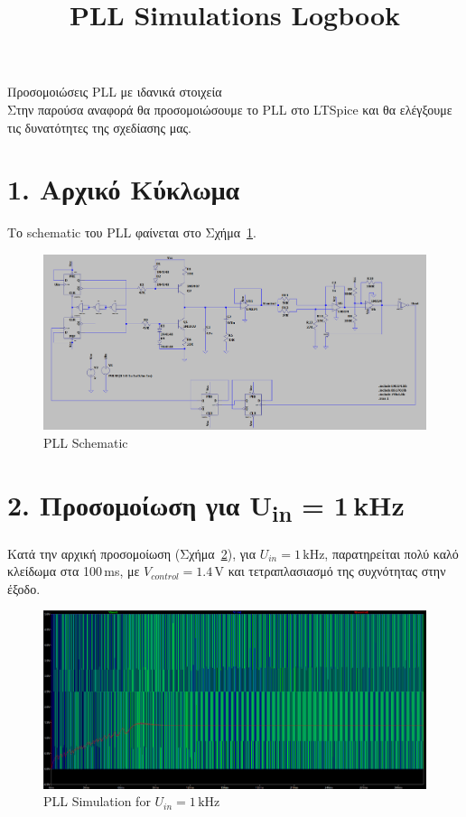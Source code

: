 \documentclass[11pt,letterpaper]{article}
\begin{document}
\univlogo

\title{PLL Simulations Logbook}
\vspace{0.5cm}
{\Huge Προσομοιώσεις PLL με ιδανικά στοιχεία}\\[5mm]

Στην παρούσα αναφορά θα προσομοιώσουμε το PLL στο LTSpice και θα ελέγξουμε τις δυνατότητες της σχεδίασης μας.\\[2mm]

\section*{1. Αρχικό Κύκλωμα}
Το schematic του PLL φαίνεται στο Σχήμα~\ref{fig:pll_schematic}.

\begin{figure}[H]
    \centering
    \includegraphics[width=\textwidth]{figures/pll.png}
    \caption{PLL Schematic}
    \label{fig:pll_schematic}
\end{figure}

\section*{2. Προσομοίωση για U\textsubscript{in} = 1 kHz}
Κατά την αρχική προσομοίωση (Σχήμα~\ref{fig:pll_simulation_1khz}), για \( U_{in} = 1\,\text{kHz} \), παρατηρείται πολύ καλό κλείδωμα στα 100 ms, με \( V_{control} = 1.4\,\text{V} \) και τετραπλασιασμό της συχνότητας στην έξοδο.

\begin{figure}[H]
    \centering
    \includegraphics[width=\textwidth]{figures/sim1.png}
    \caption{PLL Simulation for \( U_{in} = 1\,\text{kHz} \)}
    \label{fig:pll_simulation_1khz}
\end{figure}
\end{document}

